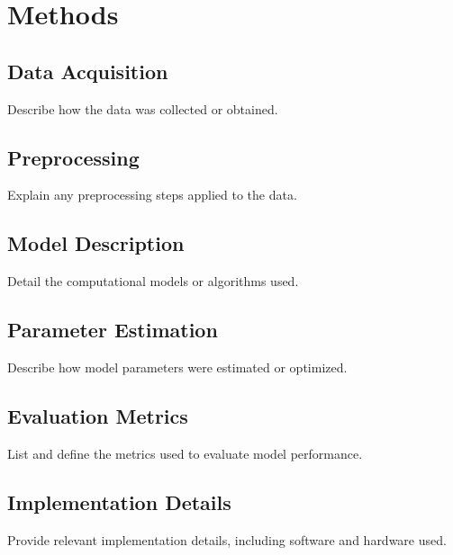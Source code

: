 \section{Methods}
\label{sec:methods}

\subsection{Data Acquisition}
Describe how the data was collected or obtained.

\subsection{Preprocessing}
Explain any preprocessing steps applied to the data.

\subsection{Model Description}
Detail the computational models or algorithms used.

\subsection{Parameter Estimation}
Describe how model parameters were estimated or optimized.

\subsection{Evaluation Metrics}
List and define the metrics used to evaluate model performance.

\subsection{Implementation Details}
Provide relevant implementation details, including software and hardware used.